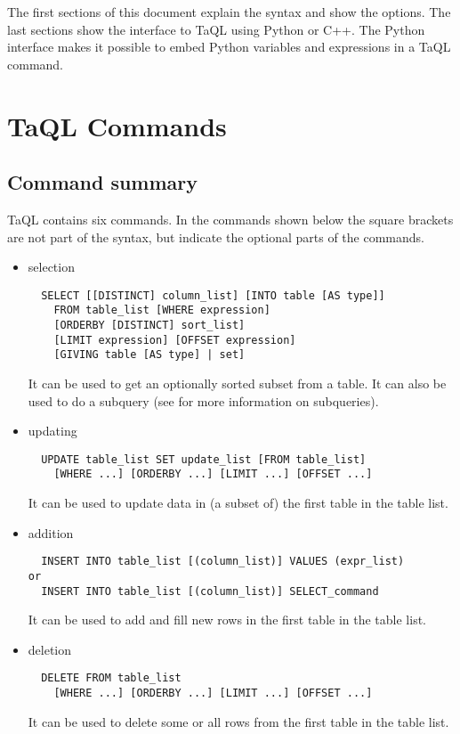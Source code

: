The first sections of this document explain the syntax and show the options.
The last sections show the interface to TaQL using Python or C++.
The Python interface makes it possible to embed Python
variables and expressions in a TaQL command.

\section{TaQL Commands}
\subsection{Command summary}
TaQL contains six commands.
In the commands shown below the square brackets are not part of the
syntax, but indicate the optional parts of the commands.

\begin{itemize}
\item selection
\begin{verbatim}
  SELECT [[DISTINCT] column_list] [INTO table [AS type]]
    FROM table_list [WHERE expression]
    [ORDERBY [DISTINCT] sort_list]
    [LIMIT expression] [OFFSET expression]
    [GIVING table [AS type] | set]
\end{verbatim}
It can be used to get an optionally sorted subset from a table. It can
also be used to do a subquery (see  
for more information on subqueries).

\item updating
\begin{verbatim}
  UPDATE table_list SET update_list [FROM table_list]
    [WHERE ...] [ORDERBY ...] [LIMIT ...] [OFFSET ...]
\end{verbatim}
It can be used to update data in (a subset of) the first table in the
table list. 

\item addition
\begin{verbatim}
  INSERT INTO table_list [(column_list)] VALUES (expr_list)
or
  INSERT INTO table_list [(column_list)] SELECT_command
\end{verbatim}
It can be used to add and fill new rows in the first table in the
table list.

\item deletion
\begin{verbatim}
  DELETE FROM table_list
    [WHERE ...] [ORDERBY ...] [LIMIT ...] [OFFSET ...]
\end{verbatim}
It can be used to delete some or all rows from the first table
in the table list.


\end{itemize}
